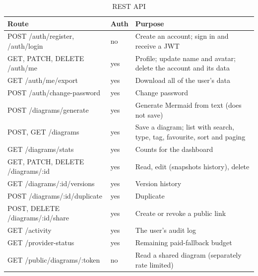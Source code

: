 \documentclass[11pt,a4paper]{article}
\begin{document}
\begin{table}[H]
\centering
\small
\begin{tabularx}{\textwidth}{@{}L{4.1cm} L{1.2cm} Y@{}}
\toprule
\textbf{Route} & \textbf{Auth} & \textbf{Purpose} \\
\midrule
POST /auth/register, /auth/login & no & Create an account; sign in and receive
    a JWT \\
GET, PATCH, DELETE /auth/me & yes & Profile; update name and avatar; delete the
    account and its data \\
GET /auth/me/export & yes & Download all of the user's data \\
POST /auth/change-password & yes & Change password \\
POST /diagrams/generate & yes & Generate Mermaid from text (does not save) \\
POST, GET /diagrams & yes & Save a diagram; list with search, type, tag,
    favourite, sort and paging \\
GET /diagrams/stats & yes & Counts for the dashboard \\
GET, PATCH, DELETE /diagrams/:id & yes & Read, edit (snapshots history),
    delete \\
GET /diagrams/:id/versions & yes & Version history \\
POST /diagrams/:id/duplicate & yes & Duplicate \\
POST, DELETE /diagrams/:id/share & yes & Create or revoke a public link \\
GET /activity & yes & The user's audit log \\
GET /provider-status & yes & Remaining paid-fallback budget \\
GET /public/diagrams/:token & no & Read a shared diagram (separately rate
    limited) \\
\bottomrule
\end{tabularx}
\caption{REST API}
\label{tab:api}
\end{table}
\end{document}
